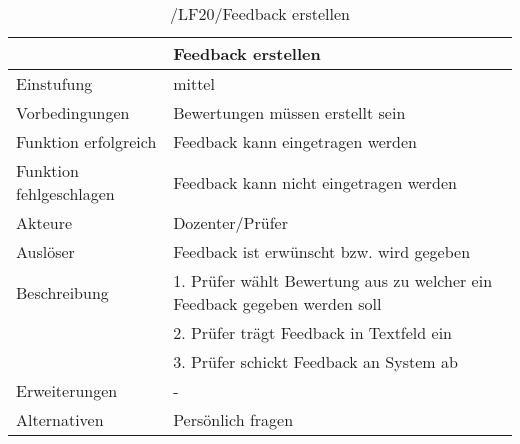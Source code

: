 	\begin{table}[H]
		\centering
		\caption{/LF20/Feedback erstellen}
		\begin{tabularx}{\textwidth}{l|X}
			\toprule
			                        & Feedback erstellen                                                        \\ \midrule
			Einstufung              & mittel                                                                    \\
			Vorbedingungen          & Bewertungen müssen erstellt sein                                          \\
			Funktion erfolgreich    & Feedback kann eingetragen werden                                          \\
			Funktion fehlgeschlagen & Feedback kann nicht eingetragen werden                                    \\
			Akteure                 & Dozenter/Prüfer                                                           \\
			Auslöser                & Feedback ist erwünscht bzw. wird gegeben                                  \\
			Beschreibung            & 1. Prüfer wählt Bewertung aus zu welcher ein Feedback gegeben werden soll \\
			                        & 2. Prüfer trägt Feedback in Textfeld ein                                  \\
			                        & 3. Prüfer schickt Feedback an System ab                                   \\
			Erweiterungen           & -                                                                         \\
			Alternativen            & Persönlich fragen                                                         \\ \bottomrule
		\end{tabularx}%
		\label{tab:LF20createFB}%
	\end{table}%
	

